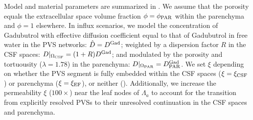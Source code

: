 \documentclass[fleqn,10pt]{wlscirep}
\begin{document}
Model and material parameters are summarized in .
We assume that the porosity equals the extracellular space volume
fraction $\phi = \phi_{\rm PAR}$ within the parenchyma and $\phi = 1$
elsewhere. In influx scenarios, we model the concentration of
Gadubutrol with effective diffusion coefficient equal to that of
Gadubutrol in free water in the PVS networks: $\hat{D} = D^{\rm Gad}$;
weighted by a dispersion factor $R$ in the CSF spaces:
$D|_{\Omega_{\rm CSF}} = ( 1 + R) D^{\rm Gad}$; and modulated by the
porosity and tortuousity ($\lambda = 1.78$) in the parenchyma:
$D|_{\Omega_{\rm PAR}} = D^{\rm Gad}_{\rm PAR}$. We set $\xi$
depending on whether the PVS segment is fully embedded within the CSF
spaces ($\xi = \xi_{\rm CSF}$) or parenchyma ($\xi = \xi_{\rm EF}$),
or neither (). Additionally, we increase the
permeability $\xi$ ($100\times$) near the leaf nodes of $\Lambda_a$ to
account for the transition from explicitly resolved PVSs to their
unresolved continuation in the CSF spaces and parenchyma.
\end{document}

